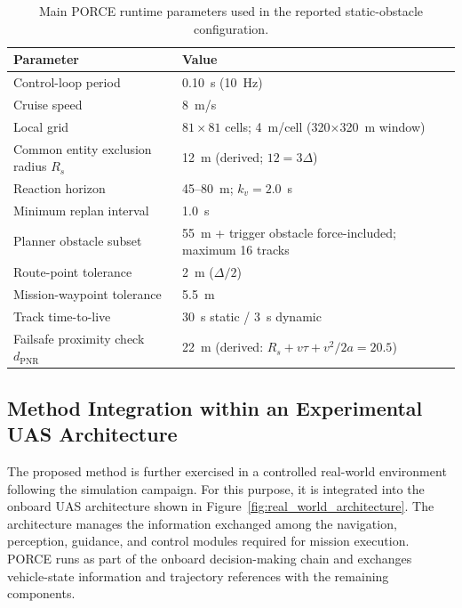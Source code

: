 \documentclass[electronics,article,submit,moreauthors]{Definitions/mdpi}
\DeclareRobustCommand{\deleted}[1]{}%
\DeclareRobustCommand{\added}[1]{#1}%
\DeclareRobustCommand{\deleted}[1]{\textcolor{black}{\sout{#1}}}
\DeclareRobustCommand{\added}[1]{\textcolor{green!50!black}{#1}}
\def\deleted#1{}%
\def\added#1{#1}%
\begin{document}
\begin{table}[h!]
\centering
\caption{\added{Main PORCE runtime parameters used in the reported static-obstacle configuration.}}
\label{tab:runtime_configuration}
\small
\begin{tabular}{ll}
\toprule
\textbf{Parameter} & \textbf{Value}\\
\midrule
\added{Control-loop period} & \added{0.10~s (10~Hz)}\\
\added{Cruise speed} & \added{8~m/s}\\
\added{Local grid} & \added{$81\times81$ cells; 4~m/cell (320$\times$320~m window)}\\
\added{Common entity exclusion radius $R_s$} & \added{12~m (derived; $12=3\Delta$)}\\
\added{Reaction horizon} & \added{45--80~m; $k_v=2.0$~s}\\
\added{Minimum replan interval} & \added{1.0~s}\\
\added{Planner obstacle subset} & \added{55~m + trigger obstacle force-included; maximum 16 tracks}\\
\added{Route-point tolerance} & \added{2~m ($\Delta/2$)}\\
\added{Mission-waypoint tolerance} & \added{5.5~m}\\
\added{Track time-to-live} & \added{30~s static / 3~s dynamic}\\
\added{Failsafe proximity check $d_{\mathrm{PNR}}$} & \added{22~m (derived: $R_s + v\tau + v^2/2a = 20.5$)}\\
\bottomrule
\end{tabular}
\end{table}



\subsection{Method Integration within \deleted{a}\added{an} Experimental UAS Architecture}
\label{sec:uas_architecture_real}

The proposed method is further \deleted{evaluated}\added{exercised} in a controlled real-world environment following the \deleted{simulation-based validation}\added{simulation campaign}. For this purpose, it is integrated into the onboard UAS architecture shown in \deleted{the }Figure\deleted{ }\added{~}\ref{fig:real_world_architecture}. The architecture \deleted{is designed to manage all}\added{manages} the information \deleted{flow between}\added{exchanged among} the navigation, perception, guidance, and control modules required for \deleted{Mission}\added{mission} execution. \deleted{Within this framework, the proposed guidance algorithm is incorporated}\added{PORCE runs} as part of the \added{onboard }decision-making \deleted{process onboard and interacts}\added{chain and exchanges vehicle-state information and trajectory references} with the remaining components\deleted{ to generate and update trajectory references during flight.}\added{.}
\end{document}
